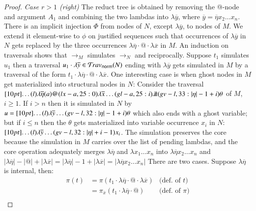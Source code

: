 \documentclass{elsarticle}
\newif\iflongversion
\theoremstyle{plain}
\theoremstyle{definition}
\newcommand{\ghostlmd}{{\lambda\!\!\lambda}}
\newcommand{\ghostvar}{\theta}
\newcommand{\normalizing}{{\sf norm}}
\newcommand{\travsetnorm}{\travset_\normalizing} %
\def\coresymbol{\pi} %
\begin{document}
\begin{proof}
\noindent
\emph{Case $r>1$ (right)} The reduct tree is obtained by removing the @-node and argument $A_1$ and combining the two lambdas into $\lambda\overline{y}$,
where $\overline{y} = \overline\eta x_2 \ldots x_n$.
%
There is an implicit injection $\Phi$ from nodes of $N$, except $\lambda\overline{y}$, to nodes of $M$.
We extend it element-wise to $\phi$ on justified sequences
such that occurrences of $\lambda\overline{y}$ in $N$ gets replaced by the three occurrences $\lambda\overline\eta \cdot @ \cdot \lambda\overline{x}$ in $M$.
%
An induction on traversals shows that $\rightarrow_M$ simulates $\rightarrow_N$ and reciprocally.
%
Suppose $t_1$ simulates $u_1$ then a
 traversal $u_1 \cdot \lambda\overline{y} \in \travsetnorm(N)$
ending with $\lambda\overline{y}$
gets simulated in $M$ by a traversal of the form
$t_1 \cdot \lambda\overline{\eta} \cdot @ \cdot \lambda\overline{x}$.
%
One interesting case is when ghost nodes in $M$ get materialized into structural nodes in $N$:
Consider the traversal
$\Pstr[10pt]{\ldots
    (l){\lambda\overline\eta}  (a)@  (lx-a,25:0){\lambda\overline{x}} \ldots (gl-a,25:i)\ghostlmd  (gv-l,33:{|\eta|-1+i})\ghostvar }
$ of $M$, $i\geq1$.
If $i>n$ then it is simulated in $N$
by $u = \Pstr[10pt]{\ldots
    (l){\lambda\overline y}  \ldots   (gv-l,32:{|\eta|-1+i})\ghostvar }
$ which also ends with a ghost variable;
but if $i\leq n$ then the $\ghostvar$ gets materialized into variable occurrence $x_i$ in $N$:
$\Pstr[10pt]{
    \ldots  (l){\lambda\overline y} \ldots  (gv-l,32:{|\eta|+i-1}){x_i} }
$.
%
    The simulation preserves the core because the simulation in $M$
    carries over the list of pending lambdas, and the core operation adequately merges $\lambda\overline\eta$ and $\lambda x_1 \ldots x_n$ into
    $\lambda\overline\eta x_2 \ldots x_n$
and
    $|\lambda\overline{\eta}| - |@| + |\lambda\overline{x}|
    =|\lambda\overline{\eta}| - 1 + |\lambda\overline{x}|
    =|\lambda\overline{\eta}x_2\ldots x_n|
    $
\iflongversion
    There are two cases. Suppose $\lambda\overline\eta$ is internal, then:
    \begin{align*}
        \coresymbol(t)
        &=  \coresymbol(t_1 \cdot \lambda\overline{\eta} \cdot @ \cdot \lambda\overline{x})
            & \mbox{(def.~of $t$)}
        \\
        &=  \coresymbol_{\overline{x}}(t_1 \cdot
        \lambda\overline\eta \cdot @)
            & \mbox{(def.~of $\coresymbol$)}
        \\

\end{align*}
\end{proof}
\end{document}
